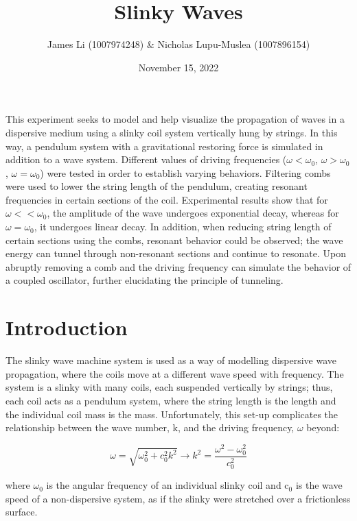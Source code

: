 \documentclass[12pt, letterpaper, twoside]{article}
\title{\textbf{Slinky Waves}\vspace{-1.5em}}
\author{James Li (1007974248) & Nicholas Lupu-Muslea (1007896154)}\vspace{-2em}
\date{November 15, 2022}
\renewenvironment{abstract}
 {\small
  \begin{center}
  \bfseries \abstractname\vspace{-.5em}\vspace{0pt}
  \end{center}
  \list{}{
    \setlength{\leftmargin}{0cm}%
    \setlength{\rightmargin}{\leftmargin}%
  }%
  \item\relax}
 {\endlist}
\begin{document}
\maketitle

\begin{abstract}

This experiment seeks to model and help visualize the propagation of waves in a dispersive medium using a slinky coil system vertically hung by strings. In this way, a pendulum system with a gravitational restoring force is simulated in addition to a wave system. Different values of driving frequencies ($\omega < \omega_0$, $\omega > \omega_0$, $\omega = \omega_0$) were tested in order to establish varying behaviors. Filtering combs were used to lower the string length of the pendulum, creating resonant frequencies in certain sections of the coil. Experimental results show that for $\omega << \omega_0$, the amplitude of the wave undergoes exponential decay, whereas for $\omega = \omega_0$, it undergoes linear decay. In addition, when reducing string length of certain sections using the combs, resonant behavior could be observed; the wave energy can tunnel through non-resonant sections and continue to resonate. Upon abruptly removing a comb and the driving frequency can simulate the behavior of a coupled oscillator, further elucidating the principle of tunneling.
    
\end{abstract}


\section{Introduction}

The slinky wave machine system is used as a way of modelling dispersive wave propagation, where the coils move at a different wave speed with frequency. The system is a slinky with many coils, each suspended vertically by strings; thus, each coil acts as a pendulum system, where the string length is the length and the individual coil mass is the mass. Unfortunately, this set-up complicates the relationship between the wave number, k, and the driving frequency, $\omega$ beyond:

\begin{equation}
    \omega = \sqrt{\omega_0^2 + c_0^2k^2} \longrightarrow k^2 = \frac{\omega^2 - \omega_0^2}{c_0^2}
\end{equation}

where $\omega_0$ is the angular frequency of an individual slinky coil and c$_0$ is the wave speed of a non-dispersive system, as if the slinky were stretched over a frictionless surface.
\end{document}
